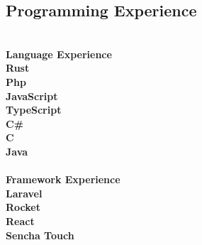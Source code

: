 \documentclass{res}
\begin{document}
\begin{resume}
        \section{Programming Experience}
        \vspace{-0.2in}
        \begin{tabbing}
            \\ \bf Language Experience
            \\ Rust
            \\ Php
            \\ JavaScript
            \\ TypeScript
            \\ C#
            \\ C
            \\ Java
            \\
            \\ \bf Framework Experience
            \\ Laravel
            \\ Rocket
            \\ React
            \\ Sencha Touch
        \end{tabbing}
    \end{resume}
\end{document}
